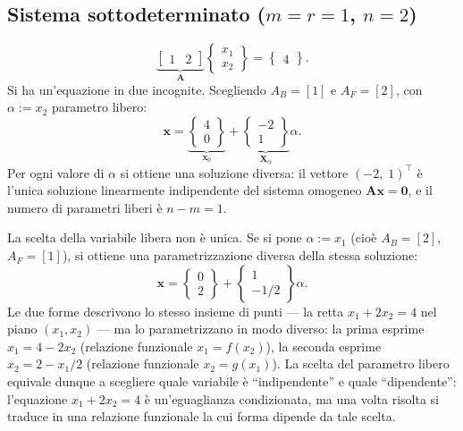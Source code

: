 \subsection{Sistema sottodeterminato	(\texorpdfstring{$m=r=1$, $n=2$}{m=r=1, n=2})}

\begin{equation}
	\underbrace{\begin{bmatrix} 1 & 2 \end{bmatrix}}_{\bm{A}}
	\begin{Bmatrix} x_1 \\ x_2 \end{Bmatrix}
	= \begin{Bmatrix} 4 \end{Bmatrix}.
\end{equation}
Si ha un'equazione in due incognite. Scegliendo $A_B=[1]$ e $A_F=[2]$, con $\alpha:=x_2$ parametro libero:
\begin{equation}
	\bm{x}
	= \underbrace{\begin{Bmatrix} 4 \\ 0 \end{Bmatrix}}_{\bm{x}_0}
	+ \underbrace{\begin{Bmatrix} -2 \\ 1 \end{Bmatrix}}_{\bm{X}_\alpha} \alpha.
\end{equation}
Per ogni valore di $\alpha$ si ottiene una soluzione diversa: il vettore
$(-2,\;1)^\top$ \`e l'unica soluzione linearmente indipendente del sistema
omogeneo $\bm{A}\bm{x}=\bm{0}$, e il numero di parametri liberi \`e $n-m=1$.


La scelta della variabile libera non \`e unica. Se si pone
$\alpha:=x_1$ (cio\`e $A_B=[2]$, $A_F=[1]$), si ottiene una
parametrizzazione diversa della stessa soluzione:
\begin{equation}
	\bm{x}
	= \begin{Bmatrix} 0 \\ 2 \end{Bmatrix}
	+ \begin{Bmatrix} 1 \\ -1/2 \end{Bmatrix} \alpha.
\end{equation}
Le due forme descrivono lo stesso insieme di punti --- la retta
$x_1 + 2x_2 = 4$ nel piano $(x_1,x_2)$ --- ma lo parametrizzano
in modo diverso: la prima esprime $x_1 = 4-2x_2$ (relazione
funzionale $x_1=f(x_2)$), la seconda esprime $x_2=2-x_1/2$
(relazione funzionale $x_2=g(x_1)$). La scelta del parametro
libero equivale dunque a scegliere quale variabile \`e
``indipendente'' e quale ``dipendente'': l'equazione
$x_1+2x_2=4$ \`e un'eguaglianza condizionata, ma una volta
risolta si traduce in una relazione funzionale la cui forma
dipende da tale scelta.

